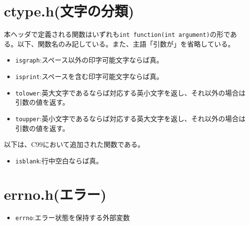 \section{ctype.h(文字の分類)}
本ヘッダで定義される関数はいずれも\verb|int function(int argument)|の形である。以下、関数名のみ記している。また、主語「引数が」を省略している。
\begin{itemize}
\item \verb|isgraph|:スペース以外の印字可能文字ならば真。
\item \verb|isprint|:スペースを含む印字可能文字ならば真。
\item \verb|tolower|:英大文字であるならば対応する英小文字を返し、それ以外の場合は引数の値を返す。
\item \verb|toupper|:英小文字であるならば対応する英大文字を返し、それ以外の場合は引数の値を返す。
\end{itemize}
以下は、C99において追加された関数である。
\begin{itemize}
\item \verb|isblank|:行中空白ならば真。
\end{itemize}

\section{errno.h(エラー)}
\begin{itemize}
\item \verb|errno|:エラー状態を保持する外部変数
\end{itemize}

